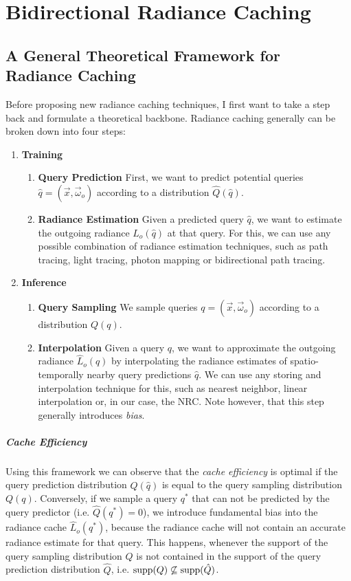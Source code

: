
\chapter{Bidirectional Radiance Caching}
\label{chap:bidirectional_caching}

\section{A General Theoretical Framework for Radiance Caching}
Before proposing new radiance caching techniques, I first want to take a step back and formulate a theoretical backbone.
Radiance caching generally can be broken down into four steps:
\begin{enumerate}
    \item \textbf{Training}
    \begin{enumerate}
        \item \textbf{Query Prediction} First, we want to predict potential queries $\hat{q} = (\vec{x}, \vec{\omega}_o)$ according to a distribution $\hat{Q}(\hat{q})$.
        \item \textbf{Radiance Estimation} Given a predicted query $\hat{q}$, we want to estimate the outgoing radiance $L_o(\hat{q})$ at that query.
        For this, we can use any possible combination of radiance estimation techniques, such as path tracing, light tracing, photon mapping or bidirectional path tracing.
    \end{enumerate}
    \item \textbf{Inference}
    \begin{enumerate}
        \item \textbf{Query Sampling} We sample queries $q = (\vec{x}, \vec{\omega}_o)$ according to a distribution $Q(q)$.
        \item \textbf{Interpolation} Given a query $q$, we want to approximate the outgoing radiance $\hat{L}_o(q)$ by interpolating the radiance estimates of spatio-temporally nearby query predictions $\hat{q}$.
        We can use any storing and interpolation technique for this, such as nearest neighbor, linear interpolation or, in our case, the NRC.
        Note however, that this step generally introduces \emph{bias}.
    \end{enumerate}
\end{enumerate}

\paragraph{Cache Efficiency}
\label{par:cache_efficiency}
Using this framework we can observe that the \emph{cache efficiency} is optimal if the query prediction distribution $\hat{Q}(\hat{q})$ is equal to the query sampling distribution $Q(q)$.
Conversely, if we sample a query $q^*$ that can not be predicted by the query predictor (i.e. $\hat{Q}(q^*)=0$), we introduce fundamental bias into the radiance cache $\hat{L}_o(q^*)$, because the radiance cache will not contain an accurate radiance estimate for that query.
This happens, whenever the support of the query sampling distribution $Q$ is not contained in the support of the query prediction distribution $\hat{Q}$, i.e. $\operatorname{\mathrm{supp}}(Q) \not\subseteq \operatorname{\mathrm{supp}}(\hat{Q})$.

